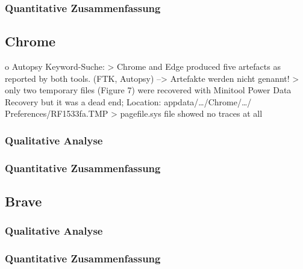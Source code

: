 \subsubsection*{Quantitative Zusammenfassung}



\subsection{Chrome}

o Autopsy Keyword-Suche: 
	> Chrome and Edge produced five artefacts as reported by both tools. (FTK, Autopsy) \cite{Gabet.2018}
		--> Artefakte werden nicht genannt!
	> only two temporary files (Figure 7) were recovered with Minitool Power Data Recovery but it was a dead end; Location: appdata/…/Chrome/…/ Preferences/RF1533fa.TMP \cite{Fayyad.2021}
	> pagefile.sys file showed no traces at all \cite{Said.2011}
	
\subsubsection*{Qualitative Analyse}

\subsubsection*{Quantitative Zusammenfassung}


\subsection{Brave}

\subsubsection*{Qualitative Analyse}

\subsubsection*{Quantitative Zusammenfassung}
